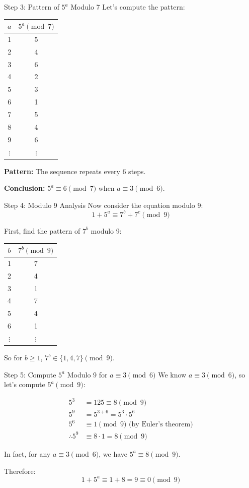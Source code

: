 \begin{frame}{Step 3: Pattern of $5^a$ Modulo 7}
    Let's compute the pattern:
    
    \begin{tabular}{c|c}
        $a$ & $5^a \pmod 7$ \\ \hline
        1 & 5 \\
        2 & 4 \\
        3 & 6 \\
        4 & 2 \\
        5 & 3 \\
        6 & 1 \\
        7 & 5 \\
        8 & 4 \\
        9 & 6 \\
        $\vdots$ & $\vdots$
    \end{tabular}
    
    \vspace{0.2cm}
    \textbf{Pattern:} The sequence repeats every 6 steps.
    
    \textbf{Conclusion:} $5^a \equiv 6 \pmod 7$ when $a \equiv 3 \pmod 6$.
\end{frame}

\begin{frame}{Step 4: Modulo 9 Analysis}
    Now consider the equation modulo 9:
    \[1 + 5^a \equiv 7^b + 7^c \pmod 9\]
    
    First, find the pattern of $7^b$ modulo 9:
    
    \begin{tabular}{c|c}
        $b$ & $7^b \pmod 9$ \\ \hline
        1 & 7 \\
        2 & 4 \\
        3 & 1 \\
        4 & 7 \\
        5 & 4 \\
        6 & 1 \\
        $\vdots$ & $\vdots$
    \end{tabular}
    
    \vspace{0.2cm}
    So for $b \geq 1$, $7^b \in \{1,4,7\} \pmod 9$.
\end{frame}

\begin{frame}{Step 5: Compute $5^a$ Modulo 9 for $a \equiv 3 \pmod 6$}
    We know $a \equiv 3 \pmod 6$, so let's compute $5^a \pmod 9$:
    
    \begin{align*}
        5^3 &= 125 \equiv 8 \pmod 9 \\
        5^9 &= 5^{3+6} = 5^3 \cdot 5^6 \\
        5^6 &\equiv 1 \pmod 9 \text{ (by Euler's theorem)} \\
        \therefore 5^9 &\equiv 8 \cdot 1 = 8 \pmod 9
    \end{align*}
    
    In fact, for any $a \equiv 3 \pmod 6$, we have $5^a \equiv 8 \pmod 9$.
    
    Therefore:
    \[1 + 5^a \equiv 1 + 8 = 9 \equiv 0 \pmod 9\]
\end{frame}

